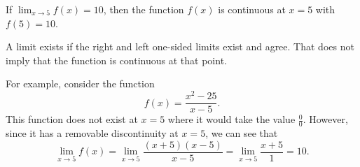 \documentclass{ximera}
\author{Emma Smith Zbarsky}
\begin{document}
\begin{exercise}

If $\displaystyle \lim_{x\to 5} f(x) = 10$, then the function $f(x)$ is
continuous at $x=5$ with $f(5)=10$.


\begin{hint}
A limit exists if the right and left one-sided limits exist and agree.
That does not imply that the function is continuous at that point.
\end{hint}


\begin{hint}
For example, consider the function \[f(x) = \frac{x^2-25}{x-5}.\] This
function does not exist at $x=5$ where it would take the value
$\displaystyle \frac{0}{0}.$ However, since it has a removable
discontinuity at $x=5$, we can see that
\[\lim_{x\to 5} f(x) = \lim_{x\to 5}\frac{(x+5)(x-5)}{x-5} = \lim_{x\to 5}\frac{x+5}{1} = 10.\]
\end{hint}


\begin{multipleChoice}
\end{multipleChoice}

\end{exercise}
\end{document}

